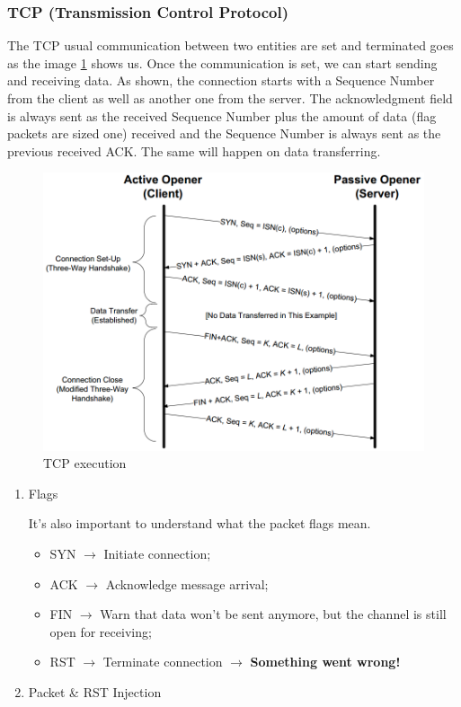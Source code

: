 \documentclass[11pt]{article}
\begin{document}
{\subsubsection{TCP (Transmission Control Protocol)}
\label{sec:org9f3d190}
The TCP usual communication between two entities are set and terminated goes as the image \ref{tcp} shows us. Once the communication is set, we can start sending and receiving data. As shown, the connection starts with a Sequence Number from the client as well as another one from the server. The acknowledgment field is always sent as the received Sequence Number plus the amount of data (flag packets are sized one) received and the Sequence Number is always sent as the previous received ACK. The same will happen on data transferring.  

\begin{figure}[htbp]
\centering
\includegraphics[height=0.5\textwidth]{res/TCP.png}
\caption{\label{tcp}
TCP execution}
\end{figure} 

\begin{enumerate}
\item Flags
\label{sec:orga52cf63}

It's also important to understand what the packet flags mean.
\begin{itemize}
\item SYN \(\to\) Initiate connection;
\item ACK \(\to\) Acknowledge message arrival;
\item FIN \(\to\) Warn that data won't be sent anymore, but the channel is still open for receiving;
\item RST \(\to\) Terminate connection \(\to\) \textbf{Something went wrong!}
\end{itemize}
\item Packet \& RST Injection
\label{sec:org55c499b}


\end{enumerate}}
\end{document}
